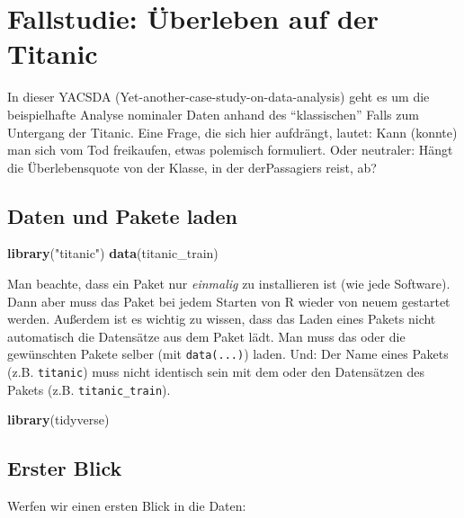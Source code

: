 \documentclass[12pt,]{book}
\newenvironment{Shaded}{\begin{snugshade}}{\end{snugshade}}
\newcommand{\KeywordTok}[1]{\textcolor[rgb]{0.13,0.29,0.53}{\textbf{{#1}}}}
\newcommand{\StringTok}[1]{\textcolor[rgb]{0.31,0.60,0.02}{{#1}}}
\newcommand{\NormalTok}[1]{{#1}}
\begin{document}
\section{Fallstudie: Überleben auf der
Titanic}\label{fallstudie-uberleben-auf-der-titanic}

In dieser YACSDA (Yet-another-case-study-on-data-analysis) geht es um
die beispielhafte Analyse nominaler Daten anhand des ``klassischen''
Falls zum Untergang der Titanic. Eine Frage, die sich hier aufdrängt,
lautet: Kann (konnte) man sich vom Tod freikaufen, etwas polemisch
formuliert. Oder neutraler: Hängt die Überlebensquote von der Klasse, in
der derPassagiers reist, ab?

\subsection{Daten und Pakete laden}\label{daten-und-pakete-laden}

\begin{Shaded}
\begin{Highlighting}[]
\KeywordTok{library}\NormalTok{(}\StringTok{"titanic"}\NormalTok{)}
\KeywordTok{data}\NormalTok{(titanic_train)}
\end{Highlighting}
\end{Shaded}

Man beachte, dass ein Paket nur \emph{einmalig} zu installieren ist (wie
jede Software). Dann aber muss das Paket bei jedem Starten von R wieder
von neuem gestartet werden. Außerdem ist es wichtig zu wissen, dass das
Laden eines Pakets nicht automatisch die Datensätze aus dem Paket lädt.
Man muss das oder die gewünschten Pakete selber (mit \texttt{data(...)})
laden. Und: Der Name eines Pakets (z.B. \texttt{titanic}) muss nicht
identisch sein mit dem oder den Datensätzen des Pakets (z.B.
\texttt{titanic\_train}).

\begin{Shaded}
\begin{Highlighting}[]
\KeywordTok{library}\NormalTok{(tidyverse)}
\end{Highlighting}
\end{Shaded}

\subsection{Erster Blick}\label{erster-blick}

Werfen wir einen ersten Blick in die Daten:
\end{document}
